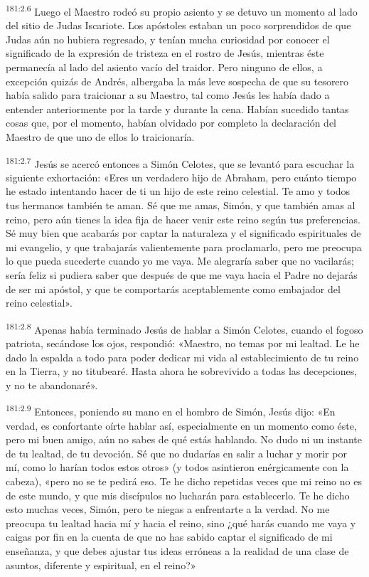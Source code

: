 \par 
\textsuperscript{181:2.6} Luego el Maestro rodeó su propio asiento y se detuvo un momento al lado del sitio de Judas Iscariote. Los apóstoles estaban un poco sorprendidos de que Judas aún no hubiera regresado, y tenían mucha curiosidad por conocer el significado de la expresión de tristeza en el rostro de Jesús, mientras éste permanecía al lado del asiento vacío del traidor. Pero ninguno de ellos, a excepción quizás de Andrés, albergaba la más leve sospecha de que su tesorero había salido para traicionar a su Maestro, tal como Jesús les había dado a entender anteriormente por la tarde y durante la cena. Habían sucedido tantas cosas que, por el momento, habían olvidado por completo la declaración del Maestro de que uno de ellos lo traicionaría.

\par 
\textsuperscript{181:2.7} Jesús se acercó entonces a Simón Celotes, que se levantó para escuchar la siguiente exhortación: «Eres un verdadero hijo de Abraham, pero cuánto tiempo he estado intentando hacer de ti un hijo de este reino celestial. Te amo y todos tus hermanos también te aman. Sé que me amas, Simón, y que también amas al reino, pero aún tienes la idea fija de hacer venir este reino según tus preferencias. Sé muy bien que acabarás por captar la naturaleza y el significado espirituales de mi evangelio, y que trabajarás valientemente para proclamarlo, pero me preocupa lo que pueda sucederte cuando yo me vaya. Me alegraría saber que no vacilarás; sería feliz si pudiera saber que después de que me vaya hacia el Padre no dejarás de ser mi apóstol, y que te comportarás aceptablemente como embajador del reino celestial».

\par 
\textsuperscript{181:2.8} Apenas había terminado Jesús de hablar a Simón Celotes, cuando el fogoso patriota, secándose los ojos, respondió: «Maestro, no temas por mi lealtad. Le he dado la espalda a todo para poder dedicar mi vida al establecimiento de tu reino en la Tierra, y no titubearé. Hasta ahora he sobrevivido a todas las decepciones, y no te abandonaré».

\par 
\textsuperscript{181:2.9} Entonces, poniendo su mano en el hombro de Simón, Jesús dijo: «En verdad, es confortante oírte hablar así, especialmente en un momento como éste, pero mi buen amigo, aún no sabes de qué estás hablando. No dudo ni un instante de tu lealtad, de tu devoción. Sé que no dudarías en salir a luchar y morir por mí, como lo harían todos estos otros» (y todos asintieron enérgicamente con la cabeza), «pero no se te pedirá eso. Te he dicho repetidas veces que mi reino no es de este mundo, y que mis discípulos no lucharán para establecerlo. Te he dicho esto muchas veces, Simón, pero te niegas a enfrentarte a la verdad. No me preocupa tu lealtad hacia mí y hacia el reino, sino ¿qué harás cuando me vaya y caigas por fin en la cuenta de que no has sabido captar el significado de mi enseñanza, y que debes ajustar tus ideas erróneas a la realidad de una clase de asuntos, diferente y espiritual, en el reino?»

